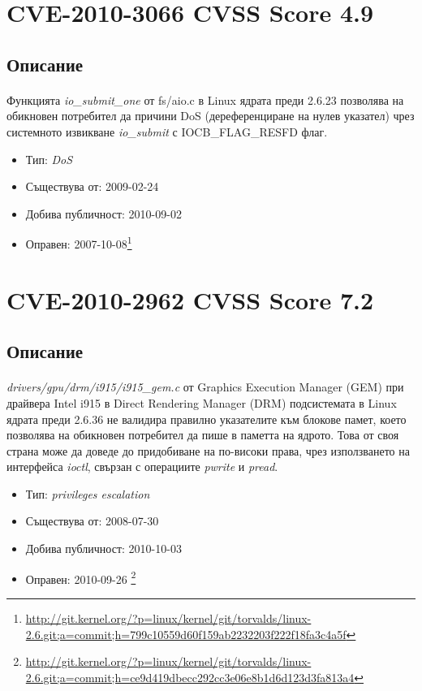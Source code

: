 \documentclass[a4paper,12pt,leqno]{article}
\begin{document}
\section{CVE-2010-3066 CVSS Score 4.9}
\subsection{Описание}
\paragraph{}
Функцията \textit{io\_submit\_one} от fs/aio.c в Linux ядрата преди 2.6.23 позволява на обикновен потребител да причини DoS (дереференциране на нулев указател) чрез системното извикване \textit{io\_submit} с IOCB\_FLAG\_RESFD флаг.

\begin{itemize}
    \item Тип: \textit{DoS}
    \item Съществува от: 2009-02-24
  	\item Добива публичност: 2010-09-02
    \item Оправен: 2007-10-08\footnote{\url{http://git.kernel.org/?p=linux/kernel/git/torvalds/linux-2.6.git;a=commit;h=799c10559d60f159ab2232203f222f18fa3c4a5f}}
\end{itemize}

\section{CVE-2010-2962 CVSS Score 7.2}
\subsection{Описание}
\paragraph{}
\textit{drivers/gpu/drm/i915/i915\_gem.c} от Graphics Execution Manager (GEM) при драйвера Intel i915 в Direct Rendering Manager (DRM) подсистемата в Linux ядрата преди 2.6.36 не валидира правилно указателите към блокове памет, което позволява на обикновен потребител да пише в паметта на ядрото. Това от своя страна може да доведе до придобиване на по-високи права, чрез използването на интерфейса \textit{ioctl}, свързан с операциите \textit{pwrite} и \textit{pread}.

\begin{itemize}
    \item Тип: \textit{privileges escalation}
    \item Съществува от: 2008-07-30
  	\item Добива публичност: 2010-10-03
    \item Оправен: 2010-09-26 \footnote{\url{http://git.kernel.org/?p=linux/kernel/git/torvalds/linux-2.6.git;a=commit;h=ce9d419dbecc292cc3e06e8b1d6d123d3fa813a4}}
\end{itemize}
\end{document}
